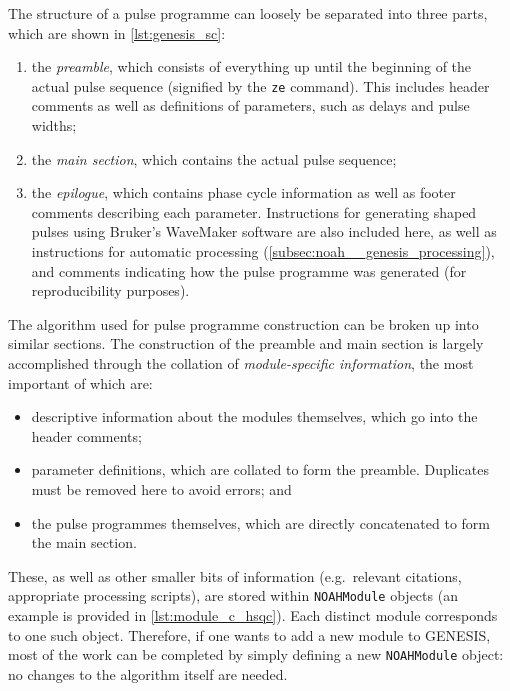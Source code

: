 The structure of a pulse programme can loosely be separated into three parts, which are shown in \cref{lst:genesis_sc}:
\begin{enumerate}
    \item the \textit{preamble}, which consists of everything up until the beginning of the actual pulse sequence (signified by the \texttt{ze} command). This includes header comments as well as definitions of parameters, such as delays and pulse widths;
    \item the \textit{main section}, which contains the actual pulse sequence;
    \item the \textit{epilogue}, which contains phase cycle information as well as footer comments describing each parameter. Instructions for generating shaped pulses using Bruker's WaveMaker software are also included here, as well as instructions for automatic processing (\cref{subsec:noah__genesis_processing}), and comments indicating how the pulse programme was generated (for reproducibility purposes).
\end{enumerate}

The algorithm used for pulse programme construction can be broken up into similar sections.
The construction of the preamble and main section is largely accomplished through the collation of \textit{module-specific information}, the most important of which are:
\begin{itemize}
    \item descriptive information about the modules themselves, which go into the header comments;
    \item parameter definitions, which are collated to form the preamble. Duplicates must be removed here to avoid errors; and
    \item the pulse programmes themselves, which are directly concatenated to form the main section.
\end{itemize}
These, as well as other smaller bits of information (e.g.\ relevant citations, appropriate processing scripts), are stored within \texttt{NOAHModule} objects (an example is provided in \cref{lst:module_c_hsqc}).
Each distinct module corresponds to one such object.
Therefore, if one wants to add a new module to GENESIS, most of the work can be completed by simply defining a new \texttt{NOAHModule} object: no changes to the algorithm itself are needed.

